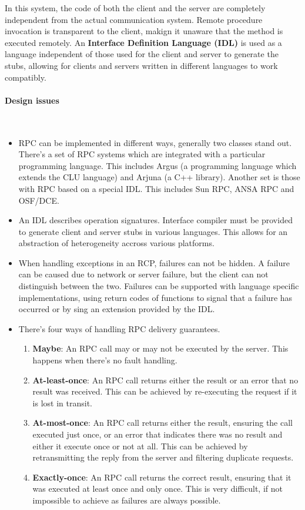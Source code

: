 \documentclass[a4paper]{article}
\newcommand{\subsubsubsection}[1]{\paragraph{#1}\mbox{}\\}
\begin{document}
In this system, the code of both the client and the server are completely independent from the actual communication system. Remote procedure invocation is transparent to the client, makign it unaware that the method is executed remotely. An \textbf{Interface Definition Language (IDL)} is used as a language independent of those used for the client and server to generate the stubs, allowing for clients and servers written in different languages to work compatibly.

\subsubsubsection{Design issues}

\begin{itemize}
\item RPC can be implemented in different ways, generally two classes stand out. There's a set of RPC systems which are integrated with a particular programming language. This includes Argus (a programming language which extends the CLU language) and Arjuna (a C++ library). Another set is those with RPC based on a special IDL. This includes Sun RPC, ANSA RPC and OSF/DCE.
\item An IDL describes operation signatures. Interface compiler must be provided to generate client and server stubs in various languages. This allows for an abstraction of heterogeneity accross various platforms.
\item When handling exceptions in an RCP, failures can not be hidden. A failure can be caused due to network or server failure, but the client can not distinguish between the two. Failures can be supported with language specific implementations, using return codes of functions to signal that a failure has occurred or by sing an extension provided by the IDL.
\item There's four ways of handling RPC delivery guarantees.
\begin{enumerate}
\item \textbf{Maybe}: An RPC call may or may not be executed by the server. This happens when there's no fault handling.
\item \textbf{At-least-once}: An RPC call returns either the result or an error that no result was received. This can be achieved by re-executing the request if it is lost in transit.
\item \textbf{At-most-once}: An RPC call returns either the result, ensuring the call executed just once, or an error that indicates there was no result and either it execute once or not at all. This can be achieved by retransmitting the reply from the server and filtering duplicate requests.
\item \textbf{Exactly-once}: An RPC call returns the correct result, ensuring that it was executed at least once and only once. This is very difficult, if not impossible to achieve as failures are always possible.

\end{enumerate}
\end{itemize}
\end{document}
